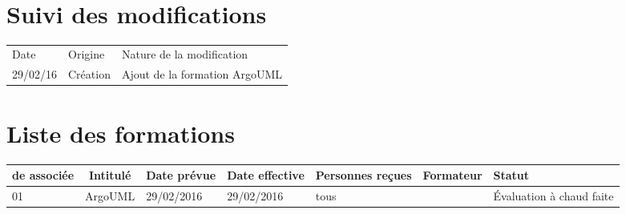 \documentclass[asi,sansVersion]{picInsa}
\begin{document}
	\begin{center}
		\LARGE
		\textsc{
			\PF{}\\
		}
	\end{center}
	\vspace{0.5cm}

	\section*{Suivi des modifications}
	\begin{table}[H]
		\centering
		\begin{tabularx}{18cm}{|p{1.7cm}|p{4cm}|X|}
		\hline
		\rowcolor[gray]{0.90} Date & Origine & Nature de la modification\\
		29/02/16 & Création & Ajout de la formation ArgoUML\\ \hline
		\end{tabularx}
	\end{table}
	
	\section*{Liste des formations}
		\begin{longtable}{|p{2cm}|c|p{2cm}|p{2cm}|p{2cm}|c|p{2cm}|}
			\hline
			\rowcolor{gris2}
			\No{} de \FFCourt{} associée & Intitulé & Date prévue & Date effective & Personnes reçues & Formateur & Statut \\\hline
			01 & ArgoUML & 29/02/2016 & 29/02/2016 & tous & \Julie{} & Évaluation à chaud faite\\\hline
		\end{longtable}
\end{document}
